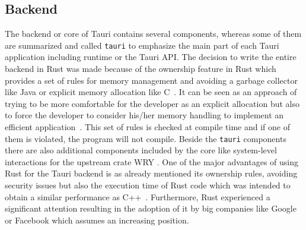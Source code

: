 \subsection{Backend}
\label{subsec:tauri:backend}
The backend or core of Tauri contains several components, whereas some of them are summarized and called \texttt{tauri} to emphasize the main part of each Tauri application including runtime or the Tauri \ac{API}.
The decision to write the entire backend in Rust was made because of the ownership feature in Rust which provides a set of rules for memory management and avoiding a garbage collector like Java or explicit memory allocation like C~\cite{tauri}.
It can be seen as an approach of trying to be more comfortable for the developer as an explicit allocation but also to force the developer to consider his/her memory handling to implement an efficient application~\cite{klabnik2019rust}.
This set of rules is checked at compile time and if one of them is violated, the program will not compile.
Beside the \texttt{tauri} components there are also additional components included by the core like system-level interactions for the upstream crate \ac{WRY} .
One of the major advantages of using Rust for the Tauri backend is as already mentioned its ownership rules, avoiding security issues but also the execution time of Rust code which was intended to obtain a similar performance as C++~\cite{klabnik2019rust}.
Furthermore, Rust experienced a significant attention resulting in the adoption of it by big companies like Google or Facebook which assumes an increasing position.

